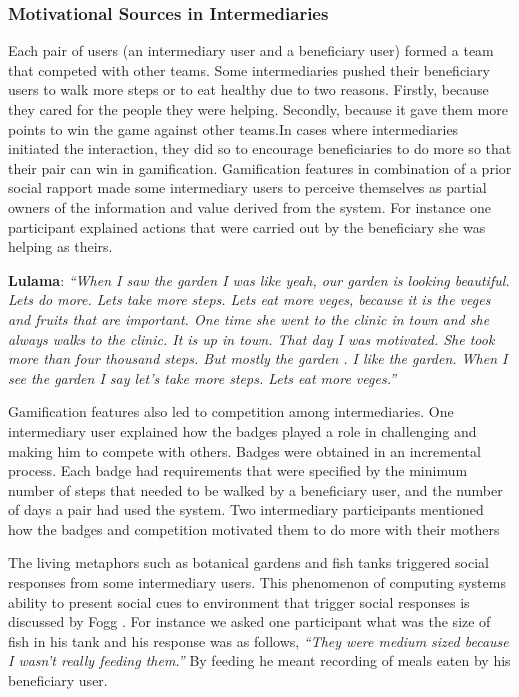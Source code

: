 \documentclass{sig-alternate}
\begin{document}
\subsubsection*{\textbf{Motivational Sources in Intermediaries}} 

Each pair of users (an intermediary user and a beneficiary user) formed a team
that competed with other teams.  Some intermediaries pushed their beneficiary
users to walk more steps or to eat healthy due to two reasons. Firstly,
because they cared for the people they were helping. Secondly, because it gave
them more points to win the game against other teams.In cases where
intermediaries initiated the interaction, they did so to encourage
beneficiaries to do more so that their pair can win in gamification.
Gamification features in combination of a prior social rapport made some
intermediary users to perceive themselves as partial owners of the information
and value derived from the system. For instance one participant explained
actions that were carried out by the beneficiary she was helping as theirs.

\textbf{Lulama}: \textit{``When I saw the garden I was like yeah, our garden 
is looking beautiful. Lets do more. Lets take more steps. Lets eat more 
veges, because it is the veges and fruits that are important. One time she 
went to the clinic in town and she always walks to the clinic. It is up in 
town. That day I was motivated. She took more than four thousand steps. But 
mostly the garden . I like the garden. When I see the garden I say let's take 
more steps. Lets eat more veges.''}


Gamification features also led to competition among intermediaries. One
intermediary user explained how the badges played a role in challenging and
making him to compete with others. Badges were obtained in an incremental
process. Each badge had requirements that were specified by the minimum 
number of steps that needed to be walked by a beneficiary user, and the 
number of
days a pair had used the system. Two intermediary participants mentioned how
the badges and competition motivated them to do more with their mothers

The living metaphors such as botanical gardens and fish tanks triggered
social responses from some intermediary users. This phenomenon of computing
systems ability to present social cues to environment that trigger social
responses is discussed by Fogg \cite{foggpersuasivebook}. For instance we
asked one participant what was the size of fish in his tank and his response
was as follows, \textit{``They were medium sized because I wasn't really
feeding them.''} By feeding he meant recording of meals eaten by his
beneficiary user.
\end{document}
